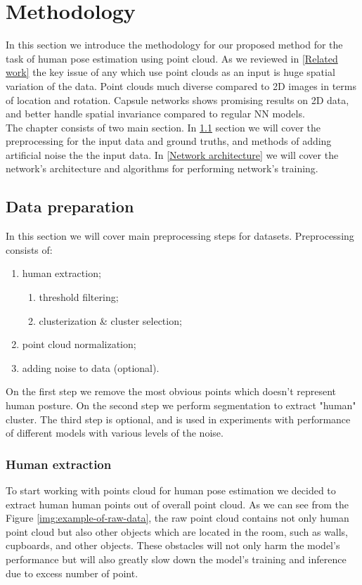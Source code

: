 \chapter{Methodology}
\label{Methodology}

In this section we introduce the methodology for our proposed method for the task of human pose estimation using point cloud. As we reviewed in \ref{Related work} the key issue of any which use point clouds as an input is huge spatial variation of the data. Point clouds much diverse compared to 2D images in terms of location and rotation. Capsule networks shows promising results \parencite{sabour_dynamic_2017} on 2D data, and better handle spatial invariance compared to regular NN models.  \\
The chapter consists of two main section. In \ref{Data preparation} section we will cover the preprocessing for the input data and ground truths, and methods of adding artificial noise the the input data. In \ref{Network architecture} we will cover the network's architecture and algorithms for performing network's training.


\section{Data preparation}
\label{Data preparation}
In this section we will cover main preprocessing steps for datasets. Preprocessing consists of:
\begin{enumerate}
  \item human extraction;
  \begin{enumerate}
    \item threshold filtering;
    \item clusterization \& cluster selection;
  \end{enumerate}
  \item point cloud normalization;
  \item adding noise to data (optional).
\end{enumerate}

On the first step we remove the most obvious points which doesn't represent human posture. On the second step we perform segmentation to extract "human" cluster. The third step is optional, and is used in experiments with performance of different models with various levels of the noise.


\subsection{Human extraction}
To start working with points cloud for human pose estimation we decided to extract human human points out of overall point cloud. As we can see from the Figure \ref{img:example-of-raw-data}, the raw point cloud contains not only human point cloud but also other objects which are located in the room, such as walls, cupboards, and other objects. These obstacles will not only harm the model's performance but will also greatly slow down the model's training and inference due to excess number of point.

